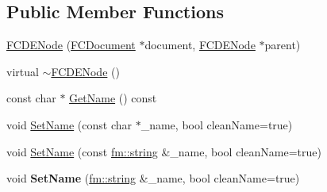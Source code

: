 \subsection*{Public Member Functions}
\begin{DoxyCompactItemize}
\item 
\hyperlink{classFCDENode_aacc68c7cf15eb43b08d8183a2f1feb21}{FCDENode} (\hyperlink{classFCDocument}{FCDocument} $\ast$document, \hyperlink{classFCDENode}{FCDENode} $\ast$parent)
\item 
virtual \hyperlink{classFCDENode_a2b18abc6ddbcfe7182afba2e0234f760}{$\sim$FCDENode} ()
\item 
const char $\ast$ \hyperlink{classFCDENode_a595efe3b26ec3f240192f730fc312989}{GetName} () const 
\item 
void \hyperlink{classFCDENode_a4f60977945ccf9769bce6558cce2ce62}{SetName} (const char $\ast$\_\-name, bool cleanName=true)
\item 
void \hyperlink{classFCDENode_a9e8a6d96f8c53770a453c5da257212ed}{SetName} (const \hyperlink{classfm_1_1stringT}{fm::string} \&\_\-name, bool cleanName=true)
\item 
\hypertarget{classFCDENode_a8de6084312fdd3ff7cf63c172871d6e9}{
void {\bfseries SetName} (\hyperlink{classfm_1_1stringT}{fm::string} \&\_\-name, bool cleanName=true)}
\label{classFCDENode_a8de6084312fdd3ff7cf63c172871d6e9}


\end{DoxyCompactItemize}
